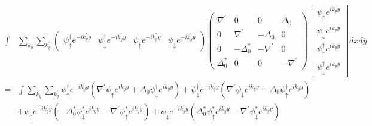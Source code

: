\documentclass{jarticle}
\begin{document}
  \begin{align}
  \begin{split}
  	\int&\displaystyle\sum_{k_y}\sum_{k_y^{'}}\begin{pmatrix}
  	\psi_{\uparrow}^{\dagger}e^{-ik_y^{'}y} & \psi_{\downarrow}^{\dagger}e^{-ik_y^{'}y} & \psi_{\uparrow}e^{-ik_y^{'}y} & \psi_{\downarrow}e^{-ik_y^{'}y}
  	\end{pmatrix} \begin{pmatrix}
  	\nabla^{'} & 0 & 0 & \Delta_0 \\ 
  	0 & \nabla^{'} & -\Delta_0 & 0 \\ 
  	0 & -\Delta^{*}_0 & -\nabla^{'} & 0 \\ 
  	\Delta^{*}_0 & 0 & 0 & -\nabla^{'}
  	\end{pmatrix} \displaystyle\begin{bmatrix}
  	\psi_{\uparrow}e^{ik_yy} \\
  	\psi_{\downarrow}e^{ik_yy} \\
  	\psi_{\uparrow}^{\dagger} e^{ik_yy}\\
  	\psi_{\downarrow}^{\dagger}e^{ik_yy}
  	\end{bmatrix}dxdy
  	\\=&\int\displaystyle\sum_{k_y}\sum_{k_y^{'}}\psi_{\uparrow}^{\dagger}e^{-ik_y^{'}y}(\nabla^{'}\psi_{\uparrow}e^{ik_yy}+\Delta_0\psi_{\downarrow}^{\dagger}e^{ik_yy})
  	                                                                 +\psi_{\downarrow}^{\dagger}e^{-ik_y^{'}y}(\nabla^{'}\psi_{\downarrow}e^{ik_yy}-\Delta_0\psi_{\uparrow}^{\dagger}e^{ik_yy})\\&
  	                                                                +\psi_{\uparrow}e^{-ik_y^{'}y}(-\Delta^{*}_0\psi_{\downarrow}^{*}e^{ik_yy}-\nabla^{'}\psi_{\uparrow}^{*}e^{ik_yy})
  	                                                                 +\psi_{\downarrow}e^{-ik_y^{'}y}(\Delta^{*}_0\psi_{\uparrow}^{*}e^{ik_yy}-\nabla^{'}\psi_{\downarrow}^{*}e^{ik_yy})
  \end{split}	                                                                 
\end{align}
\end{document}
